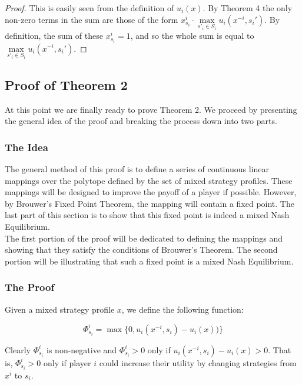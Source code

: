 \documentclass[12pt]{article}
\begin{document}
\begin{proof}
This is easily seen from the definition of $u_i(x)$. By Theorem 4 the only non-zero terms in the sum are those of the form $x^i_{s_i} \cdot \max\limits_{s'_i \in S_i}  u_i(x^{-i}, s_i')$. By definition, the sum of these $x^i_{s_i} = 1$, and so the whole sum is equal to $\max\limits_{s'_i \in S_i}  u_i(x^{-i}, s_i')$.
\end{proof}

\subsection{Proof of Theorem 2}

At this point we are finally ready to prove Theorem 2. We proceed by presenting the general idea of the proof and breaking the process down into two parts.\\

\subsubsection{The Idea}

The general method of this proof is to define a series of continuous linear mappings over the polytope defined by the set of mixed strategy profiles. These mappings will be designed to improve the payoff of a player if possible. However, by Brouwer's Fixed Point Theorem, the mapping will contain a fixed point. The last part of this section is to show that this fixed point is indeed a mixed Nash Equilibrium.\\

The first portion of the proof will be dedicated to defining the mappings and showing that they satisfy the conditions of Brouwer's Theorem. The second portion will be illustrating that such a fixed point is a mixed Nash Equilibrium.

\subsubsection[The Proof]{The Proof\cite{26}} 

Given a mixed strategy profile $x$, we define the following function:

\begin{equation*}
\Phi^i_{s_i} = \max\{ 0,u_i(x^{-i},s_i) - u_i(x))\}
\end{equation*}

Clearly $\Phi^i_{s_i}$ is non-negative and $\Phi^i_{s_i} > 0$ only if $u_i(x^{-i},s_i) - u_i(x) > 0$. That is, $\Phi^i_{s_i} > 0$ only if player $i$ could increase their utility by changing strategies from $x^i$ to $s_i$.\\
\end{document}
